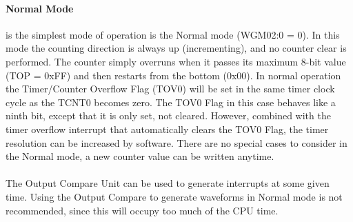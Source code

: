 \documentclass[english]{article}
\begin{document}
\paragraph{Normal Mode} is the simplest mode of operation is the Normal mode (WGM02:0 = 0). In this mode the counting direction is always up (incrementing), and no counter clear is performed. The counter simply overruns when it passes its maximum 8-bit value (TOP = 0xFF) and then restarts from the bottom (0x00). In normal operation the Timer/Counter Overflow Flag (TOV0) will be set in the same timer clock cycle as the TCNT0 becomes zero. The TOV0 Flag in this case behaves like a ninth
bit, except that it is only set, not cleared. However, combined with the timer overflow interrupt
that automatically clears the TOV0 Flag, the timer resolution can be increased by software.
There are no special cases to consider in the Normal mode, a new counter value can be written
anytime. \\\\
The Output Compare Unit can be used to generate interrupts at some given time. Using the Output Compare to generate waveforms in Normal mode is not recommended, since this will
occupy too much of the CPU time.	
\end{document}
